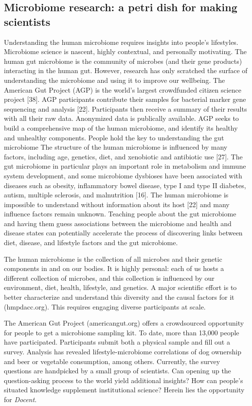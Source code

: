 \subsection{Microbiome research: a petri dish for making scientists}
Understanding the human microbiome requires insights
into people’s lifestyles. Microbiome science is nascent, highly contextual, and personally motivating.
The human gut microbiome is the community of microbes
(and their gene products) interacting in the human gut.
However, research has only scratched the surface of understanding the microbiome and using it to improve our wellbeing. The American Gut Project (AGP) is the world's
largest crowdfunded citizen science project [38]. AGP
participants contribute their samples for bacterial marker
gene sequencing and analysis [22]. Participants then receive
a summary of their results with all their raw data. Anonymized data is publically available. AGP seeks to build a
comprehensive map of the human microbiome, and identify
its healthy and unhealthy components.
People hold the key to understanding the gut microbiome
The structure of the human microbiome is influenced by
many factors, including age, genetics, diet, and xenobiotic
and antibiotic use [27]. The gut microbiome in particular
plays an important role in metabolism and immune system
development, and some microbiome dysbioses have been
associated with diseases such as obesity, inflammatory
bowel disease, type I and type II diabetes, autism, multiple
sclerosis, and malnutrition [16]. The human microbiome is
impossible to understand without information about its host
[22] and many influence factors remain unknown. Teaching
people about the gut microbiome and having them guess
associations between the microbiome and health and disease states can potentially accelerate the process of discovering links between diet, disease, and lifestyle factors and
the gut microbiome.

The human microbiome is the collection of all microbes and
their genetic components in and on our bodies. It is highly
personal: each of us hosts a different collection of microbes,
and this collection is influenced by our environment, diet,
health, lifestyle, and genetics. A major scientific effort is to
better characterize and understand this diversity and the
causal factors for it (hmpdacc.org). This requires engaging
diverse participants at scale.

The American Gut Project (americangut.org) offers a
crowdsourced opportunity for people to get a microbiome
sampling kit. To date, more than 13,000 people have participated.
Participants submit both a physical sample and fill out
a survey. Analysis has revealed lifestyle-microbiome correlations
of dog ownership and beer or vegetable consumption,
among others. Currently, the survey questions are handpicked
by a small group of scientists. Can opening up the
question-asking process to the world yield additional insights?
How can people’s situated knowledge supplement institutional
science? Herein lies the opportunity for \textit{Docent}.


